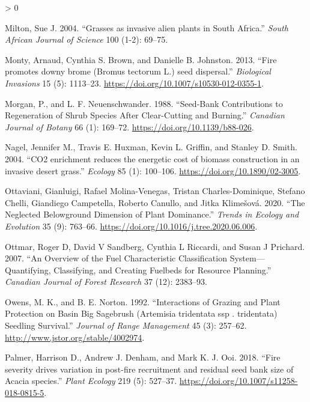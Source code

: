 \documentclass[
  12pt,
]{article}
\newlength{\cslhangindent}
\newenvironment{CSLReferences}[2] %
 {%
  \setlength{\parindent}{0pt}
  \ifodd #1 \everypar{\setlength{\hangindent}{\cslhangindent}}\ignorespaces\fi
  \ifnum #2 > 0
  \setlength{\parskip}{#2\baselineskip}
  \fi
 }%
 {}
\begin{document}
\begin{CSLReferences}{1}{0}
\leavevmode\hypertarget{ref-Milton2004}{}%
Milton, Sue J. 2004. {``{Grasses as invasive alien plants in South
Africa}.''} \emph{South African Journal of Science} 100 (1-2): 69--75.

\leavevmode\hypertarget{ref-Monty2013}{}%
Monty, Arnaud, Cynthia S. Brown, and Danielle B. Johnston. 2013.
{``{Fire promotes downy brome (Bromus tectorum L.) seed dispersal}.''}
\emph{Biological Invasions} 15 (5): 1113--23.
\url{https://doi.org/10.1007/s10530-012-0355-1}.

\leavevmode\hypertarget{ref-Morgan1988}{}%
Morgan, P., and L. F. Neuenschwander. 1988. {``Seed-Bank Contributions
to Regeneration of Shrub Species After Clear-Cutting and Burning.''}
\emph{Canadian Journal of Botany} 66 (1): 169--72.
\url{https://doi.org/10.1139/b88-026}.

\leavevmode\hypertarget{ref-Nagel2004}{}%
Nagel, Jennifer M., Travis E. Huxman, Kevin L. Griffin, and Stanley D.
Smith. 2004. {``{CO2 enrichment reduces the energetic cost of biomass
construction in an invasive desert grass}.''} \emph{Ecology} 85 (1):
100--106. \url{https://doi.org/10.1890/02-3005}.

\leavevmode\hypertarget{ref-Ottaviani2020}{}%
Ottaviani, Gianluigi, Rafael Molina-Venegas, Tristan Charles-Dominique,
Stefano Chelli, Giandiego Campetella, Roberto Canullo, and Jitka
Klimešová. 2020. {``{The Neglected Belowground Dimension of Plant
Dominance}.''} \emph{Trends in Ecology and Evolution} 35 (9): 763--66.
\url{https://doi.org/10.1016/j.tree.2020.06.006}.

\leavevmode\hypertarget{ref-Ottmar2007}{}%
Ottmar, Roger D, David V Sandberg, Cynthia L Riccardi, and Susan J
Prichard. 2007. {``An Overview of the Fuel Characteristic Classification
System---Quantifying, Classifying, and Creating Fuelbeds for Resource
Planning.''} \emph{Canadian Journal of Forest Research} 37 (12):
2383--93.

\leavevmode\hypertarget{ref-Owens1992}{}%
Owens, M. K., and B. E. Norton. 1992. {``{Interactions of Grazing and
Plant Protection on Basin Big Sagebrush (Artemisia tridentata ssp .
tridentata) Seedling Survival}.''} \emph{Journal of Range Management} 45
(3): 257--62. \url{http://www.jstor.org/stable/4002974}.

\leavevmode\hypertarget{ref-Palmer2018}{}%
Palmer, Harrison D., Andrew J. Denham, and Mark K. J. Ooi. 2018.
{``{Fire severity drives variation in post-fire recruitment and residual
seed bank size of Acacia species}.''} \emph{Plant Ecology} 219 (5):
527--37. \url{https://doi.org/10.1007/s11258-018-0815-5}.


\end{CSLReferences}
\end{document}
